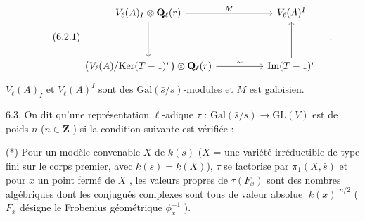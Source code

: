 \begin{equation}\tag{6.2.1}
\begin{tikzcd}[column sep=huge, row sep=huge]
V_{\ell}(A)_{I} \otimes \mathbf{Q}_{\ell}(r) \arrow[r, "M"] \arrow[d] & V_{\ell}(A)^{I} \\
\bigl(V_{\ell}(A)/\mathrm{Ker}(T-1)^{r}\bigr) \otimes \mathbf{Q}_{\ell}(r) \arrow[r, "\sim"] & \mathrm{Im}(T-1)^{r} \arrow[u]
\end{tikzcd}\quad .
\end{equation}
$V_{\ell}(A)_{I}$ \underline{et} $V_{\ell}(A)^{I}$ \underline{sont des} $\mathrm{Gal}(\bar{s}/s)$\underline{-modules et} $M$ \underline{est galoisien.}

6.3. On dit qu'une représentation $\ell$-adique $\tau$ : $\mathrm{Gal}(\bar{s}/s) \longrightarrow \mathrm{GL}(V)$ est de poids $n$ ($n \in \mathbf{Z}$ ) si la condition suivante est vérifiée :

(*) Pour un modèle convenable $X$ de $k(s)$ ($X$ = une variété irréductible de type fini sur le corps premier, avec $k(s) = k(X)$), $\tau$ se factorise par $\pi_{1}(X,\bar{s})$ et pour $x$ un point fermé de $X$ , les valeurs propres de $\tau(F_{x})$ sont des nombres algébriques dont les conjugués complexes sont tous de valeur absolue $|k(x)|^{n/2}$ ($F_{x}$ désigne le Frobenius géométrique $\phi_{x}^{-1}$ ).


